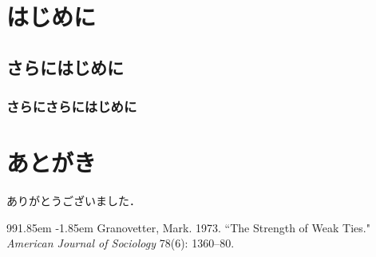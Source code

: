 \documentclass[a4paper,11pt,oneside,openany,uplatex]{jsbook}
\begin{document}
%
\frontmatter

\tableofcontents

\mainmatter

\chapter{はじめに}
\section{さらにはじめに}
\subsection{さらにさらにはじめに}

 \backmatter
\chapter{あとがき}
ありがとうございました．

\def\bibindent{1.85em}
\begin{thebibliography}{99\kern\bibindent}
\makeatletter
\def\@biblabel#1{}
\let\old@bibitem\bibitem
\def\bibitem#1{\old@bibitem{#1}\leavevmode\kern-\bibindent}
\makeatother
\small
\bibitem{}
Granovetter, Mark. 1973. ``The Strength of Weak Ties." \textit{American Journal of Sociology} 78(6): 1360--80.
\end{thebibliography}
\end{document}
